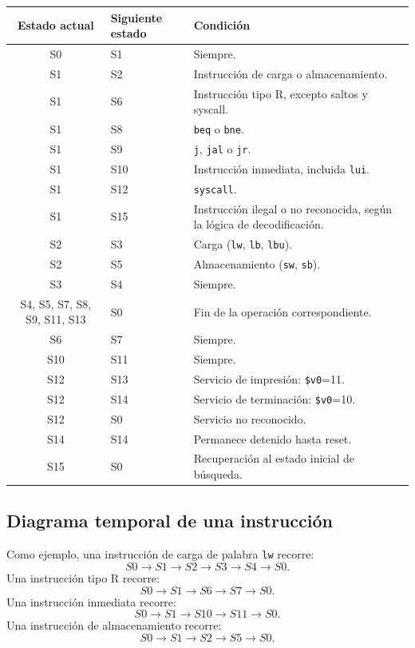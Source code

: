 \documentclass[11pt,a4paper]{article}
\begin{document}
\begin{longtable}{@{}clp{8.5cm}@{}}
    \toprule
    \textbf{Estado actual} & \textbf{Siguiente estado} & \textbf{Condición} \\
    \midrule
    S0 & S1 & Siempre. \\
    S1 & S2 & Instrucción de carga o almacenamiento. \\
    S1 & S6 & Instrucción tipo R, excepto saltos y syscall. \\
    S1 & S8 & \texttt{beq} o \texttt{bne}. \\
    S1 & S9 & \texttt{j}, \texttt{jal} o \texttt{jr}. \\
    S1 & S10 & Instrucción inmediata, incluida \texttt{lui}. \\
    S1 & S12 & \texttt{syscall}. \\
    S1 & S15 & Instrucción ilegal o no reconocida, según la lógica de decodificación. \\
    S2 & S3 & Carga (\texttt{lw}, \texttt{lb}, \texttt{lbu}). \\
    S2 & S5 & Almacenamiento (\texttt{sw}, \texttt{sb}). \\
    S3 & S4 & Siempre. \\
    S4, S5, S7, S8, S9, S11, S13 & S0 & Fin de la operación correspondiente. \\
    S6 & S7 & Siempre. \\
    S10 & S11 & Siempre. \\
    S12 & S13 & Servicio de impresión: \texttt{\$v0}=11. \\
    S12 & S14 & Servicio de terminación: \texttt{\$v0}=10. \\
    S12 & S0 & Servicio no reconocido. \\
    S14 & S14 & Permanece detenido hasta reset. \\
    S15 & S0 & Recuperación al estado inicial de búsqueda. \\
    \bottomrule
\end{longtable}

\subsection{Diagrama temporal de una instrucción}

Como ejemplo, una instrucción de carga de palabra \texttt{lw} recorre:
\[
    S0 \rightarrow S1 \rightarrow S2 \rightarrow S3 \rightarrow S4 \rightarrow S0.
\]
Una instrucción tipo R recorre:
\[
S0 \rightarrow S1 \rightarrow S6 \rightarrow S7 \rightarrow S0.
\]
Una instrucción inmediata recorre:
\[
    S0 \rightarrow S1 \rightarrow S10 \rightarrow S11 \rightarrow S0.
\]
Una instrucción de almacenamiento recorre:
\[
    S0 \rightarrow S1 \rightarrow S2 \rightarrow S5 \rightarrow S0.
\]
\end{document}
